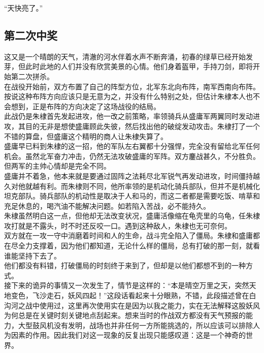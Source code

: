 \begin{multicols}{\theparacolNo}
“天快亮了。”\\

\subsection{第二次中奖}
这又是一个晴朗的天气，清澈的河水伴着水声不断奔涌，初春的绿草已经开始发芽，但此时此地的人们并没有欣赏美景的心情。他们身着盔甲，手持刀剑，即将开始第二次拼杀。\\

在战役开始前，双方布置了自己的阵型方位，北军东北向布阵，南军西南向布阵。按说这种布阵方向应该只是无意为之，并没有什么特别之处，但估计朱棣本人也不会想到，正是布阵的方向决定了这场战役的结局。\\

此战仍是朱棣首先发起进攻，他一改之前策略，率领骑兵从盛庸军两翼同时发动进攻，其目的无非是想使盛庸顾此失彼，然后找出他的破绽发动攻击。朱棣打了一个不错的算盘，但盛庸这个精明的商人让朱棣失算了。\\

盛庸早已料到朱棣的这一招，他的军队左右翼都十分强悍，完全没有留给北军任何机会。虽然北军奋力冲击，仍然无法攻破盛庸的军阵。双方鏖战甚久，不分胜负。但两军的主帅心情却是完全不同。\\

盛庸并不着急，他本来就是要通过固阵之法耗尽北军锐气再发动进攻，时间僵持越久对他就越有利。而朱棣则不同，他所率领的是机动化骑兵部队，但并不是机械化坦克部队。骑兵部队的机动性是取决于人和马的，而这二者都是需要吃饭、啃草和充足休息的，喝汽油不能解决问题。如若陷入苦战，必不能持久。\\

朱棣虽然明白这一点，但他却无法改变状况，盛庸活像缩在龟壳里的乌龟，任朱棣攻打就是不露头，时不时还反咬一口。遇到这种敌人，朱棣也无可奈何。\\

双方就在一攻一守中消磨着时间和人的生命，战斗完全陷入了僵局。朱棣和盛庸都在尽全力支撑着，因为他们都知道，无论什么样的僵局，总有打破的那一刻，就看谁能坚持下去了。\\

他们都没有料错，打破僵局的时刻终于来到了，但却是以他们都想不到的一种方式。\\

接下来的诡异的事情又一次发生了，情节是这样的：“本是晴空万里之天，突然天地变色，飞沙走石，妖风四起！”这段话看起来十分眼熟，不错，此段描述曾在白沟河之战中使用过，这里再次使用实在是因为以我之能力，实在无法解释这股妖风为何总是在关键时刻关键地点刮起来。想来当时的作战双方都没有天气预报的能力，大型鼓风机没有发明，战场也并非任何一方所能挑选的，所以应该可以排除人为因素的作用。因此我们对这一现象的反复出现只能感叹道：这是一个神奇的世界。\\


\end{multicols}
